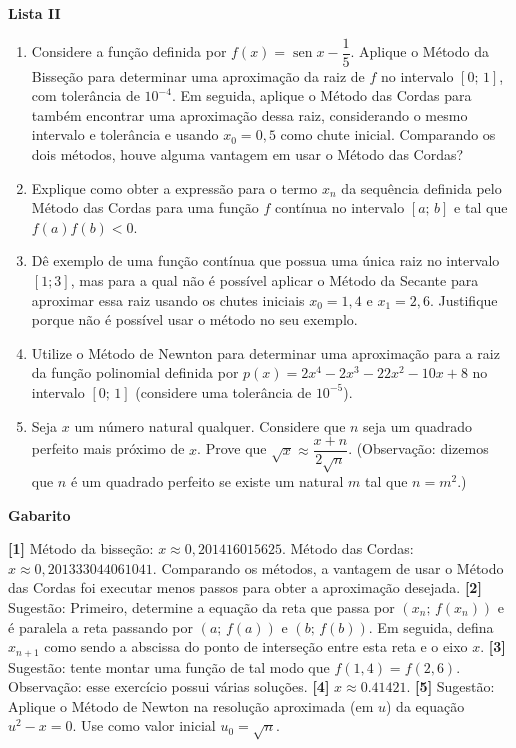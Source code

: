 \documentclass[12pt,a4paper]{article}
\DeclareMathOperator{\sen}{sen}
\begin{document}
\begin{center}
  \textbf{Lista II}
\end{center}

\begin{enumerate}
  \item Considere a função definida por $f(x) = \sen x - \dfrac{1}{5}$. Aplique o
  Método da Bisseção para determinar uma aproximação da raiz de $f$ no intervalo $[0;\,1]$,
  com tolerância de $10^{-4}$. Em seguida, aplique o Método das Cordas para também
  encontrar uma aproximação dessa raiz, considerando o mesmo intervalo e tolerância e
  usando $x_0=0,5$ como chute inicial. Comparando os dois métodos, houve alguma vantagem 
  em usar o Método das Cordas?

  \item Explique como obter a expressão para o termo $x_n$ da sequência definida
  pelo Método das Cordas para uma função $f$ contínua no intervalo $[a;\,b]$ e tal
  que $f(a)f(b)<0$.

  \item Dê exemplo de uma função contínua que possua uma única raiz no intervalo $[1; 3]$,
  mas para a qual não é possível aplicar o Método da Secante para aproximar essa raiz usando
  os chutes iniciais $x_0 = 1,4$ e $x_1 = 2,6$. Justifique porque não é possível usar
  o método no seu exemplo.
  
  \item Utilize o Método de Newnton para determinar uma aproximação para a raiz da
  função polinomial definida por $p(x) = 2x^4 -2x^3 -22x^2 - 10x + 8$ no intervalo
  $[0;\,1]$ (considere uma tolerância de $10^{-5}$).
  
  \item Seja $x$ um número natural qualquer. Considere que $n$ seja um quadrado
  perfeito mais próximo de $x$. Prove que $\sqrt{x}\approx \dfrac{x+n}{2\sqrt{n}}$. 
 (Observação: dizemos que $n$ é um quadrado perfeito se existe um natural $m$ tal
 que $n = m^2$.) 
\end{enumerate}

\begin{center}
  \textbf{Gabarito}
\end{center}

\textbf{[1]} Método da bisseção: $x\approx 0,201416015625$. Método das Cordas: 
$x\approx 0,201333044061041$. Comparando os métodos, a vantagem de usar o 
Método das Cordas foi executar menos passos para obter a aproximação desejada.
\textbf{[2]} Sugestão: Primeiro, determine a equação da reta que passa por $(x_n;\,f(x_n))$ e
é paralela a reta passando por $(a;\,f(a))$ e $(b;\,f(b))$. Em seguida, defina $x_{n+1}$ como
sendo a abscissa do ponto de interseção entre esta reta e o eixo $x$. 
\textbf{[3]} Sugestão: tente montar uma função de tal modo que $f(1,4) = f(2,6)$. 
Observação: esse exercício possui várias soluções. 
\textbf{[4]} $x\approx 0.41421$. 
\textbf{[5]} Sugestão: Aplique o Método de Newton na resolução aproximada (em $u$) da equação $u^2 - x = 0$. Use como valor inicial $u_0 = \sqrt{n}$.
\end{document}
